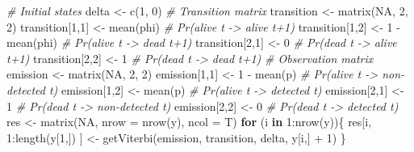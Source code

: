 \documentclass[
  12pt,
]{krantz}
\newenvironment{Shaded}{\begin{snugshade}}{\end{snugshade}}
\newcommand{\AttributeTok}[1]{\textcolor[rgb]{0.77,0.63,0.00}{#1}}
\newcommand{\CommentTok}[1]{\textcolor[rgb]{0.56,0.35,0.01}{\textit{#1}}}
\newcommand{\ConstantTok}[1]{\textcolor[rgb]{0.00,0.00,0.00}{#1}}
\newcommand{\ControlFlowTok}[1]{\textcolor[rgb]{0.13,0.29,0.53}{\textbf{#1}}}
\newcommand{\DecValTok}[1]{\textcolor[rgb]{0.00,0.00,0.81}{#1}}
\newcommand{\FunctionTok}[1]{\textcolor[rgb]{0.00,0.00,0.00}{#1}}
\newcommand{\NormalTok}[1]{#1}
\newcommand{\OtherTok}[1]{\textcolor[rgb]{0.56,0.35,0.01}{#1}}
\newcommand{\SpecialCharTok}[1]{\textcolor[rgb]{0.00,0.00,0.00}{#1}}
\begin{document}
\begin{Shaded}
\begin{Highlighting}[]
\CommentTok{\# Initial states}
\NormalTok{delta }\OtherTok{\textless{}{-}} \FunctionTok{c}\NormalTok{(}\DecValTok{1}\NormalTok{, }\DecValTok{0}\NormalTok{)}
\CommentTok{\# Transition matrix}
\NormalTok{transition }\OtherTok{\textless{}{-}} \FunctionTok{matrix}\NormalTok{(}\ConstantTok{NA}\NormalTok{, }\DecValTok{2}\NormalTok{, }\DecValTok{2}\NormalTok{)}
\NormalTok{transition[}\DecValTok{1}\NormalTok{,}\DecValTok{1}\NormalTok{] }\OtherTok{\textless{}{-}} \FunctionTok{mean}\NormalTok{(phi)      }\CommentTok{\# Pr(alive t {-}\textgreater{} alive t+1)}
\NormalTok{transition[}\DecValTok{1}\NormalTok{,}\DecValTok{2}\NormalTok{] }\OtherTok{\textless{}{-}} \DecValTok{1} \SpecialCharTok{{-}} \FunctionTok{mean}\NormalTok{(phi)  }\CommentTok{\# Pr(alive t {-}\textgreater{} dead t+1)}
\NormalTok{transition[}\DecValTok{2}\NormalTok{,}\DecValTok{1}\NormalTok{] }\OtherTok{\textless{}{-}} \DecValTok{0}              \CommentTok{\# Pr(dead t {-}\textgreater{} alive t+1)}
\NormalTok{transition[}\DecValTok{2}\NormalTok{,}\DecValTok{2}\NormalTok{] }\OtherTok{\textless{}{-}} \DecValTok{1}              \CommentTok{\# Pr(dead t {-}\textgreater{} dead t+1)}
\CommentTok{\# Observation matrix }
\NormalTok{emission }\OtherTok{\textless{}{-}} \FunctionTok{matrix}\NormalTok{(}\ConstantTok{NA}\NormalTok{, }\DecValTok{2}\NormalTok{, }\DecValTok{2}\NormalTok{)}
\NormalTok{emission[}\DecValTok{1}\NormalTok{,}\DecValTok{1}\NormalTok{] }\OtherTok{\textless{}{-}} \DecValTok{1} \SpecialCharTok{{-}} \FunctionTok{mean}\NormalTok{(p)      }\CommentTok{\# Pr(alive t {-}\textgreater{} non{-}detected t)}
\NormalTok{emission[}\DecValTok{1}\NormalTok{,}\DecValTok{2}\NormalTok{] }\OtherTok{\textless{}{-}} \FunctionTok{mean}\NormalTok{(p)          }\CommentTok{\# Pr(alive t {-}\textgreater{} detected t)}
\NormalTok{emission[}\DecValTok{2}\NormalTok{,}\DecValTok{1}\NormalTok{] }\OtherTok{\textless{}{-}} \DecValTok{1}                \CommentTok{\# Pr(dead t {-}\textgreater{} non{-}detected t)}
\NormalTok{emission[}\DecValTok{2}\NormalTok{,}\DecValTok{2}\NormalTok{] }\OtherTok{\textless{}{-}} \DecValTok{0}                \CommentTok{\# Pr(dead t {-}\textgreater{} detected t)}
\NormalTok{res }\OtherTok{\textless{}{-}} \FunctionTok{matrix}\NormalTok{(}\ConstantTok{NA}\NormalTok{, }\AttributeTok{nrow =} \FunctionTok{nrow}\NormalTok{(y), }\AttributeTok{ncol =}\NormalTok{ T)}
\ControlFlowTok{for}\NormalTok{ (i }\ControlFlowTok{in} \DecValTok{1}\SpecialCharTok{:}\FunctionTok{nrow}\NormalTok{(y))\{}
\NormalTok{  res[i, }\DecValTok{1}\SpecialCharTok{:}\FunctionTok{length}\NormalTok{(y[}\DecValTok{1}\NormalTok{,]) ] }\OtherTok{\textless{}{-}} \FunctionTok{getViterbi}\NormalTok{(emission, transition, delta, y[i,] }\SpecialCharTok{+} \DecValTok{1}\NormalTok{)}
\NormalTok{\}}
\end{Highlighting}
\end{Shaded}
\end{document}
